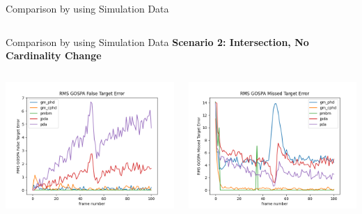 \documentclass[12pt]{beamer}
\begin{document}
\begin{frame}{Comparison by using Simulation Data}
\begin{columns}[t]
\begin{column}{0.5\linewidth}
  \end{column}
\end{columns}
\end{frame}

\begin{frame}{Comparison by using Simulation Data}
\textbf{Scenario 2: Intersection, No Cardinality Change}
\begin{columns}[t]
  \begin{column}{0.5\linewidth}
      \centering
      \includegraphics[width=\linewidth,height=\textheight,keepaspectratio]{real_data/scenario2/gospa_false.png}\\
  \end{column}
    \begin{column}{0.5\linewidth}
      \centering
      \includegraphics[width=\linewidth,height=\textheight,keepaspectratio]{real_data/scenario2/missed.png}\\
  \end{column}
\end{columns}
\end{frame}
\end{document}
